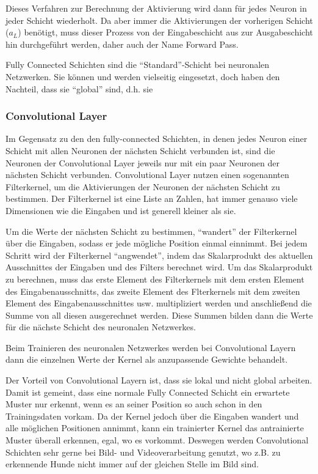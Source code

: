\documentclass[10pt]{article}
\newcommand{\feng}[1]{{#1}}
\begin{document}
Dieses Verfahren zur Berechnung der Aktivierung wird dann für jedes Neuron in jeder Schicht wiederholt.
Da aber immer die Aktivierungen der vorherigen Schicht ($a_{L}$) benötigt, muss dieser Prozess von der Eingabeschicht aus zur Ausgabeschicht hin durchgeführt werden, daher auch der Name \feng{Forward Pass}.

Fully Connected Schichten sind die \enquote{Standard}-Schicht bei neuronalen Netzwerken. 
Sie können und werden vielseitig eingesetzt, doch haben den Nachteil, dass sie \enquote{global} sind, d.h. sie 

\subsubsection{Convolutional Layer}

Im Gegensatz zu den den fully-connected Schichten, in denen jedes Neuron einer Schicht mit allen Neuronen der nächsten Schicht verbunden ist, sind die Neuronen der Convolutional Layer jeweils nur mit ein paar Neuronen der nächsten Schicht verbunden.
Convolutional Layer nutzen einen sogenannten Filterkernel, um die Aktivierungen der Neuronen der nächsten Schicht zu bestimmen.
Der Filterkernel ist eine Liste an Zahlen, hat immer genauso viele Dimensionen wie die Eingaben und ist generell kleiner als sie. 

Um die Werte der nächsten Schicht zu bestimmen, \enquote{wandert} der Filterkernel über die Eingaben, sodass er jede mögliche Position einmal einnimmt.
Bei jedem Schritt wird der Filterkernel \enquote{angwendet}, indem das Skalarprodukt des aktuellen Ausschnittes der Eingaben und des Filters berechnet wird. 
Um das Skalarprodukt zu berechnen, muss das erste Element des Filterkernels mit dem ersten Element des Eingabenausschnitts, das zweite Element des Flterkernels mit dem zweiten Element des Eingabenausschnittes usw. multipliziert werden und anschließend die Summe von all diesen ausgerechnet werden.
Diese Summen bilden dann die Werte für die nächste Schicht des neuronalen Netzwerkes.

Beim Trainieren des neuronalen Netzwerkes werden bei Convolutional Layern dann die einzelnen Werte der Kernel als anzupassende Gewichte behandelt.

Der Vorteil von Convolutional Layern ist, dass sie lokal und nicht global arbeiten.
Damit ist gemeint, dass eine normale Fully Connected Schicht ein erwartete Muster nur erkennt, wenn es an seiner Position so auch schon in den Trainingsdaten vorkam.
Da der Kernel jedoch über die Eingaben wandert und alle möglichen Positionen annimmt, kann ein trainierter Kernel das antrainierte Muster überall erkennen, egal, wo es vorkommt.
Deswegen werden Convolutional Schichten sehr gerne bei Bild- und Videoverarbeitung genutzt, wo z.B. zu erkennende Hunde nicht immer auf der gleichen Stelle im Bild sind.
\end{document}
